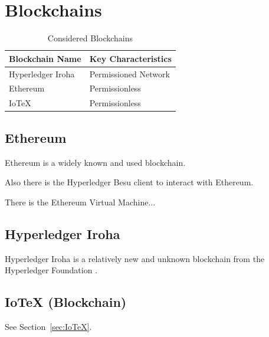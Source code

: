 \section{Blockchains} %
\label{sec:Blockchains}
\begin{table}
	\caption{Considered Blockchains}
	\label{tab:Considered Blockchains}
	\begin{center}
		\begin{tabular}[c]{|l|l|}
			\hline
			\textbf{Blockchain Name}                  & Key Characteristics  \\
			\hline
			Hyperledger Iroha \cite{hyperledger:wiki} & Permissioned Network \\
			\hline
			Ethereum                                  & Permissionless       \\
			\hline
			IoTeX \cite{iotex-bc-platform}            & Permissionless       \\
			\hline
		\end{tabular}
	\end{center}
\end{table}

\subsection{Ethereum} %
\label{sub}

Ethereum is a widely known and used blockchain.

Also there is the Hyperledger Besu \cite{hyperledger:wiki} client to interact with Ethereum.

There is the Ethereum Virtual Machine...

\subsection{Hyperledger Iroha} %
\label{sub:Hyperledger Iroha}

Hyperledger Iroha is a relatively new and unknown blockchain from the Hyperledger Foundation \cite{hyperledger:wiki}.

\subsection{IoTeX (Blockchain)} %
\label{sub:IoTeX-Blockchain}
See Section~\ref{sec:IoTeX}.


